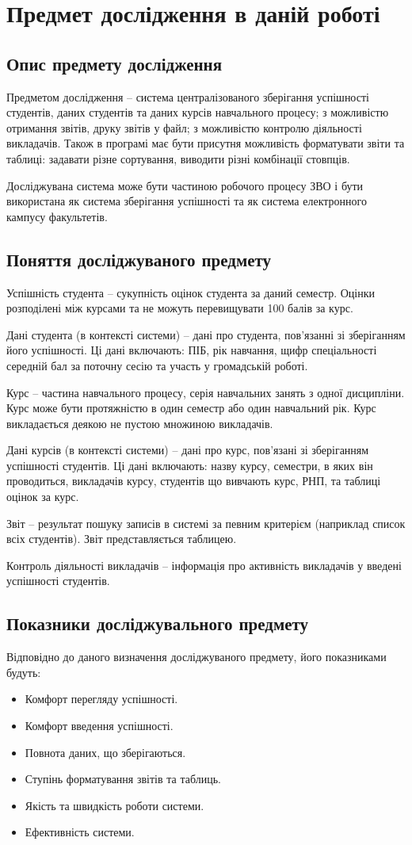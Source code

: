 \documentclass[14pt,a4paper,oneside]{extbook}
\begin{document}
\chapter{Предмет дослідження в даній роботі}
\section{Опис предмету дослідження}
	Предметом дослідження – система централізованого зберігання успішності студентів, даних студентів та даних курсів навчального процесу; з можливістю отримання звітів, друку звітів у файл; з можливістю контролю діяльності викладачів. Також в програмі має бути присутня можливість форматувати звіти та таблиці: задавати різне сортування, виводити різні комбінації стовпців.

	Досліджувана система може бути частиною робочого процесу ЗВО і бути використана як система зберігання успішності та як система електронного кампусу факультетів.

\section{Поняття досліджуваного предмету}
	Успішність студента – сукупність оцінок студента за даний семестр. Оцінки розподілені між курсами та не можуть перевищувати 100 балів за курс.

	Дані студента (в контексті системи) – дані про студента, пов’язанні зі зберіганням його успішності. Ці дані включають: ПІБ, рік навчання, щифр спеціальності середній бал за поточну сесію та участь у громадській роботі.

	Курс – частина навчального процесу, серія навчальних занять з одної дисципліни. Курс може бути протяжністю в один семестр або один навчальний рік. Курс викладається деякою не пустою множиною викладачів. 

	Дані курсів (в контексті системи) – дані про курс, пов’язані зі зберіганням успішності студентів. Ці дані включають: назву курсу, семестри, в яких він проводиться, викладачів курсу, студентів що вивчають курс, РНП, та таблиці оцінок за курс.

	Звіт – результат пошуку записів в системі за певним критерієм (наприклад список всіх студентів). Звіт представляється таблицею.

	Контроль діяльності викладачів – інформація про активність викладачів у введені успішності студентів.

\section{Показники досліджувального предмету}
	Відповідно до даного визначення досліджуваного предмету, його показниками будуть:
	\begin{itemize}
		\item Комфорт перегляду успішності.
		\item Комфорт введення успішності.
		\item Повнота даних, що зберігаються.
		\item Ступінь форматування звітів та таблиць.
		\item Якість та швидкість роботи системи.
		\item Ефективність системи.
	\end{itemize}
\end{document}
